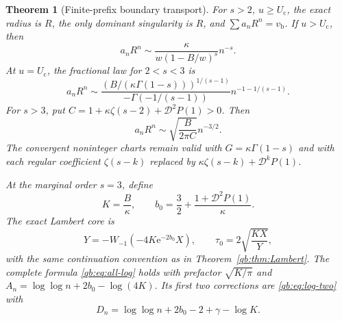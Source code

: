 \documentclass[11pt,a4paper]{article}
\newtheorem{theorem}{Theorem}[section]
\theoremstyle{definition}\newtheorem{definition}[theorem]{Definition}
\theoremstyle{remark}\newtheorem{remark}[theorem]{Remark}
\newcommand{\ee}{\mathrm e}
\newcommand{\Uc}{U_{\mathrm c}}
\newcommand{\vb}{v_{\mathrm b}}
\newcommand{\Dop}{\mathcal D}
\numberwithin{equation}{section}
\begin{document}
\begin{theorem}[Finite-prefix boundary transport]
\label{qb:thm:prefix}
For $s>2$, $u\ge\Uc$, the exact radius is $R$, the only dominant
singularity is $R$, and $\sum a_nR^n=\vb$. If $u>\Uc$, then
\begin{equation}\label{qb:eq:prefix-strict}
 a_nR^n\sim\frac{\kappa}{w(1-B/w)^s}n^{-s}.
\end{equation}
At $u=\Uc$, the fractional law for $2<s<3$ is
\begin{equation}\label{qb:eq:prefix-stable}
 a_nR^n\sim
 \frac{(B/(\kappa\Gamma(1-s)))^{1/(s-1)}}
      {-\Gamma(-1/(s-1))}n^{-1-1/(s-1)}.
\end{equation}
For $s>3$, put
$C=1+\kappa\zeta(s-2)+\Dop^2P(1)>0$. Then
\begin{equation}\label{qb:eq:prefix-finite}
 a_nR^n\sim\sqrt{\frac{B}{2\pi C}}n^{-3/2}.
\end{equation}
The convergent noninteger charts remain valid with
$G=\kappa\Gamma(1-s)$ and with each regular coefficient
$\zeta(s-k)$ replaced by
$\kappa\zeta(s-k)+\Dop^kP(1)$.

At the marginal order $s=3$, define
\begin{equation}\label{qb:eq:prefix-marginal}
 K=\frac B\kappa,\qquad
 b_0=\frac32+\frac{1+\Dop^2P(1)}\kappa.
\end{equation}
The exact Lambert core is
\begin{equation}\label{qb:eq:prefix-Lambert}
 Y=-W_{-1}(-4K\ee^{-2b_0}X),\qquad
 \tau_0=2\sqrt{\frac{KX}{Y}},
\end{equation}
with the same continuation convention as in
Theorem~\ref{qb:thm:Lambert}. The complete formula
\eqref{qb:eq:all-log} holds with prefactor $\sqrt{K/\pi}$ and
$A_n=\log\log n+2b_0-\log(4K)$. Its first two corrections are
\eqref{qb:eq:log-two} with
\begin{equation}\label{qb:eq:prefix-D}
 D_n=\log\log n+2b_0-2+\gamma-\log K.
\end{equation}
\end{theorem}
\end{document}
